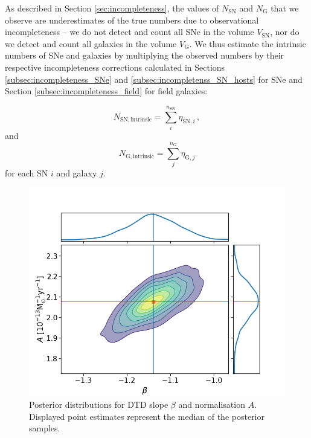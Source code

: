 \documentclass[fleqn,usenatbib]{mnras}
\begin{document}
As described in Section \ref{sec:incompleteness}, the values of $N_{\mathrm{SN}}$ and $N_{\mathrm{G}}$ that we observe are underestimates of the true numbers due to observational incompleteness -- we do not detect and count all SNe in the volume $V_{\mathrm{SN}}$, nor do we detect and count all galaxies in the volume $V_{\mathrm{G}}$. We thus estimate the intrinsic numbers of SNe and galaxies by multiplying the observed numbers by their respective incompleteness corrections calculated in Sections \ref{subsec:incompleteness_SNe} and \ref{subsec:incompletenss_SN_hosts} for SNe and Section \ref{subsec:incompleteness_field} for field galaxies:

\begin{equation}
    N_{\mathrm{SN,intrinsic}} = \sum_i^{n_{\mathrm{SN}}}\eta_{\mathrm{SN,}i}\,,
    \label{eq:corr_SN}
\end{equation}
and
\begin{equation}
    N_{\mathrm{G,intrinsic}} = \sum_j^{n_{\mathrm{G}}} \eta_{\mathrm{G,}j} 
    \label{eq:corr_G}
\end{equation}
for each SN $i$ and galaxy $j$.

\begin{figure}
    \centering
    \includegraphics[width=.5\textwidth]{figs/beta_A_Qerf1.1_corner_All.png}
    \caption{Posterior distributions for DTD slope $\beta$ and normalisation $A$. Displayed point estimates represent the median of the posterior samples.%
    \label{fig:corner_beta_norm}}
\end{figure}
\end{document}
